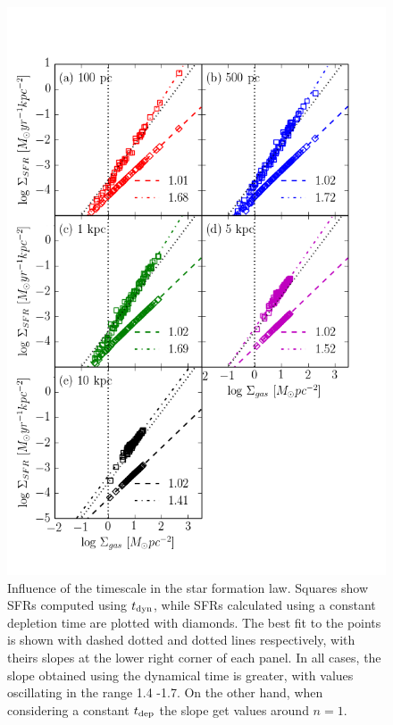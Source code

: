 \documentclass[twocolumn]{aastex}
\newcommand{\tdyn}{t_{\rm dyn}}
\newcommand{\tdep}{t_{\rm dep}}
\begin{document}
	\begin{figure}[p]
	\begin{center}
	\includegraphics[scale=0.8]{./f11.png}
	\caption{Influence of the timescale in the star formation law. Squares show SFRs computed using $\tdyn$, while SFRs calculated using a constant depletion time are plotted with diamonds. The best fit to the points is shown with dashed dotted and dotted lines respectively, with theirs slopes at the lower right corner of each panel. In all cases, the slope obtained using the dynamical time is greater, with values oscillating in the range 1.4 -1.7. On the other hand, when considering a constant $\tdep$ the slope get values around $n = 1$.}
	\label{fig:kssimulated}
	\end{center}
	\end{figure}
\end{document}
